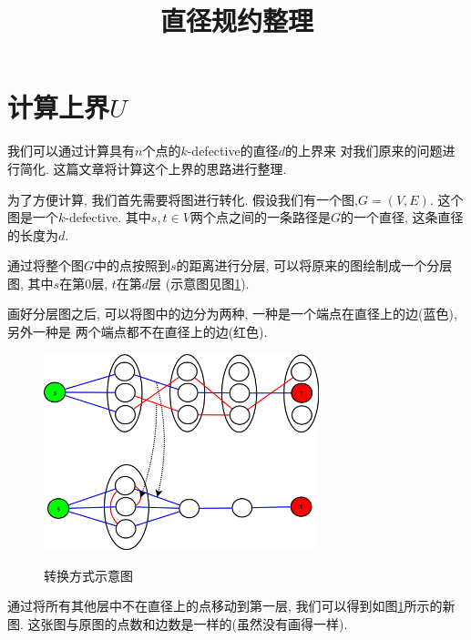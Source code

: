 \documentclass{article}
\title{直径规约整理}
\author{}
\date{}
\begin{document}
\maketitle

\section{计算上界$U$}
我们可以通过计算具有$n$个点的$k$-defective的直径$d$的上界来
对我们原来的问题进行简化. 这篇文章将计算这个上界的思路进行整理.

为了方便计算, 我们首先需要将图进行转化.
假设我们有一个图,$G = (V, E)$. 这个图是一个$k$-defective.
其中$s, t \in V$两个点之间的一条路径是$G$的一个直径, 这条直径的长度为$d$.

通过将整个图$G$中的点按照到$s$的距离进行分层, 可以将原来的图绘制成一个分层图,
其中$s$在第$0$层, $t$在第$d$层 (示意图见图\ref{fig:1}). 

画好分层图之后, 可以将图中的边分为两种, 一种是一个端点在直径上的边(蓝色), 另外一种是
两个端点都不在直径上的边(红色).

\begin{figure}[h!]
	\begin{center}
		\includegraphics[width=8cm]{origin-to-special.png} \\
		\caption{转换方式示意图}
		\label{fig:1}
	\end{center}
\end{figure}

通过将所有其他层中不在直径上的点移动到第一层, 我们可以得到如图\ref{fig:1}所示的新图.
这张图与原图的点数和边数是一样的(虽然没有画得一样).
\end{document}
